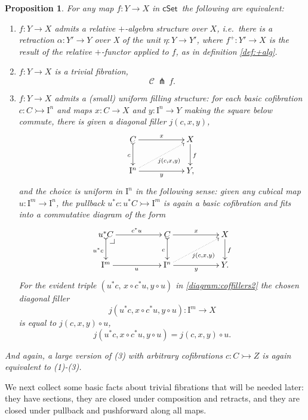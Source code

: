 \documentclass[11pt,reqno]{amsart}
\makeatletter
\newcommand{\cSet}{\ensuremath{\mathsf{cSet}}}
\newcommand{\mono}{\ensuremath{\rightarrowtail}}
\newcommand{\ra}{\ensuremath{\rightarrow}}
\newcommand{\cof}{\ensuremath{\rightarrowtail}}
\newcommand{\I}{\ensuremath{\mathrm{I}}}
\newtheorem{proposition}[theorem]{Proposition}
\theoremstyle{remark}
\theoremstyle{definition}
\newcommand{\pbcorner}[1][dr]{\save*!/#1-1.2pc/#1:(-1,1)@^{|-}\restore}
\makeatother
\begin{document}
 \begin{proposition}\label{prop:uniformstructequivrelative} For any map $f : Y\ra X$ in \cSet\ the following are equivalent:
\begin{enumerate}
\item $f:Y\ra X$ admits a \emph{relative $+$-algebra structure over $X$}, i.e.\ there is a retraction  $\alpha :Y' \ra Y$ over X of the unit $\eta : Y\ra Y'$, where $f^+ : Y' \ra X$ is the result of the relative $+$-functor applied to $f$, as in definition \ref{def:+alg}.
\item $f:Y\ra  X$ is a \emph{trivial fibration},
\[
\mathcal{C}\, \pitchfork\,f.
\]
\item $f:Y\ra  X$ admits a (small) \emph{uniform filling structure}: 
for each basic cofibration $c : C \mono \I^{n}$ and maps $x : C\ra X$ and $y : \I^n\ra Y$ making the square below commute, there is given a diagonal filler $j(c,x,y)$,
\begin{equation}\label{diagram:coffillers}
\xymatrix{
C \ar@{>->}[d]_{c} \ar[rr]^{x} && X \ar[d]^{f} \\
\I^{n}\ar@{.>}[rru]_{j(c,x,y)} \ar[rr]_{y} && Y,
}
\end{equation}
and the choice is \emph{uniform in $\I^n$} in the following sense: given any cubical map $u : \I^m \ra \I^n$, the pullback $u^*c : u^*C\mono \I^m$ is again a basic cofibration and fits into a commutative diagram of the form
\begin{equation}\label{diagram:coffillers2}
\xymatrix{
u^*C \ar@{>->}[d]_{u^*c} \ar[rr]^{c^*u} \pbcorner &&  C \ar@{>->}[d]_{c} \ar[rr]^{x} && X\ar[d]^{f} \\
\I^{m} \ar[rr]_{u} && \I^{n} \ar@{.>}[rru]_{j(c,x,y)} \ar[rr]_{y} && Y.
}
\end{equation}
For the evident triple $(u^*c,\, x\circ c^*u, y\circ u)$ in \eqref{diagram:coffillers2} the chosen diagonal filler 
\[
j(u^*c,x\circ c^*u,y\circ u): \I^m \ra X
\]
 is equal to  $j(c,x,y)\circ u$,
\begin{equation}\label{eq:uniformfillers1}
j(u^*c, x\circ c^*u,y\circ u) = j(c,x,y)\circ u.
\end{equation}
\end{enumerate}
And again, a large version of (3) with arbitrary cofibrations $c : C\cof Z$ is again equivalent to (1)-(3).
\end{proposition}

We next collect some basic facts about trivial fibrations that will be needed later: they have sections, they are closed under composition and retracts, and they are closed under pullback and pushforward along all maps.
\end{document}
